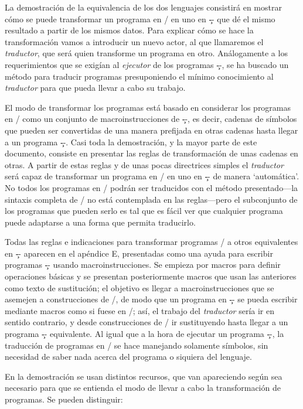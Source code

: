 %
La demostración de la equivalencia de los dos lenguajes consistirá en mostrar cómo se puede
transformar un programa en \C/ en uno en \c-- que dé el mismo resultado a partir de los mismos
datos. Para explicar cómo se hace la transformación vamos a introducir un nuevo actor, al que
llamaremos el {\it traductor}, que será quien transforme un programa en otro. Análogamente a los
requerimientos que se exigían al {\it ejecutor} de los programas \c--, se ha buscado un método para
traducir programas presuponiendo el mínimo conocimiento al {\it traductor} para que pueda llevar a
cabo su trabajo.

El modo de transformar los programas está basado en considerar los programas en \C/ como un conjunto
de macroinstrucciones de \c--, es decir, cadenas de símbolos que pueden ser convertidas de una
manera prefijada en otras cadenas hasta llegar a un programa \c--. Casi toda la demostración, y la
mayor parte de este documento, consiste en presentar las reglas de transformación de unas cadenas en
otras. A partir de estas reglas y de unas pocas directrices simples el {\it traductor} será capaz de
transformar un programa en \C/ en uno en \c-- de manera ‘automática’. No todos los programas en \C/
podrán ser traducidos con el método presentado---la sintaxis completa de \C/ no está contemplada en
las reglas---pero el subconjunto de los programas que pueden serlo es tal que es fácil ver que
cualquier programa puede adaptarse a una forma que permita traducirlo.

%
Todas las reglas e indicaciones para transformar programas \C/ a otros equivalentes en \c-- aparecen
en el apéndice E, presentadas como una ayuda para escribir programas \c-- usando
macroinstrucciones. Se empieza por macros para definir operaciones básicas y se presentan
posteriormente macros que usan las anteriores como texto de sustitución; el objetivo es llegar a
macroinstrucciones que se asemejen a construcciones de \C/, de modo que un programa en \c-- se pueda
escribir mediante macros como si fuese en \C/; así, el trabajo del {\it traductor} sería ir en
sentido contrario, y desde construcciones de \C/ ir sustituyendo hasta llegar a un programa \c--
equivalente. Al igual que a la hora de ejecutar un programa \c--, la traducción de programas en \C/
se hace manejando solamente símbolos, sin necesidad de saber nada acerca del programa o siquiera del
lenguaje.

En la demostración se usan distintos recursos, que van apareciendo según sea necesario para que se
entienda el modo de llevar a cabo la transformación de programas. Se pueden distinguir:


